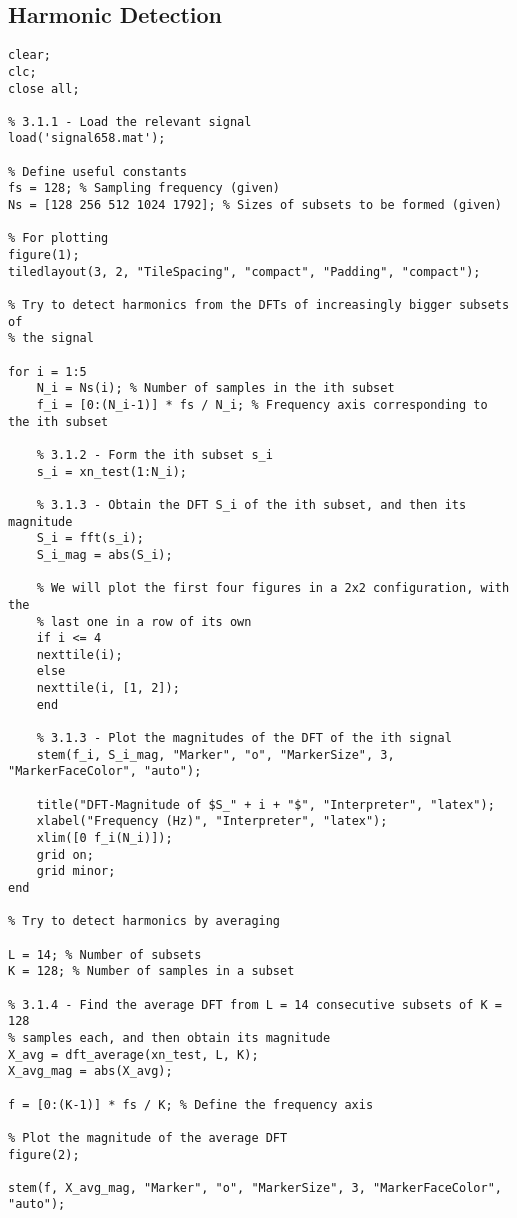 \documentclass{article}[a4paper]
\begin{document}
	\subsection{Harmonic Detection}
	\begin{lstlisting}[caption={Main Code}, label=harmonic_main]
clear;
clc;
close all;

% 3.1.1 - Load the relevant signal
load('signal658.mat');

% Define useful constants
fs = 128; % Sampling frequency (given)
Ns = [128 256 512 1024 1792]; % Sizes of subsets to be formed (given)

% For plotting
figure(1);
tiledlayout(3, 2, "TileSpacing", "compact", "Padding", "compact");

% Try to detect harmonics from the DFTs of increasingly bigger subsets of
% the signal

for i = 1:5
	N_i = Ns(i); % Number of samples in the ith subset
	f_i = [0:(N_i-1)] * fs / N_i; % Frequency axis corresponding to the ith subset
	
	% 3.1.2 - Form the ith subset s_i
	s_i = xn_test(1:N_i);
	
	% 3.1.3 - Obtain the DFT S_i of the ith subset, and then its magnitude
	S_i = fft(s_i);
	S_i_mag = abs(S_i);
	
	% We will plot the first four figures in a 2x2 configuration, with the
	% last one in a row of its own
	if i <= 4
	nexttile(i);
	else
	nexttile(i, [1, 2]);
	end
	
	% 3.1.3 - Plot the magnitudes of the DFT of the ith signal
	stem(f_i, S_i_mag, "Marker", "o", "MarkerSize", 3, "MarkerFaceColor", "auto");
	
	title("DFT-Magnitude of $S_" + i + "$", "Interpreter", "latex");
	xlabel("Frequency (Hz)", "Interpreter", "latex");
	xlim([0 f_i(N_i)]);
	grid on;
	grid minor;
end

% Try to detect harmonics by averaging

L = 14; % Number of subsets
K = 128; % Number of samples in a subset

% 3.1.4 - Find the average DFT from L = 14 consecutive subsets of K = 128
% samples each, and then obtain its magnitude
X_avg = dft_average(xn_test, L, K);
X_avg_mag = abs(X_avg);

f = [0:(K-1)] * fs / K; % Define the frequency axis

% Plot the magnitude of the average DFT
figure(2);

stem(f, X_avg_mag, "Marker", "o", "MarkerSize", 3, "MarkerFaceColor", "auto");


\end{lstlisting}
\end{document}
